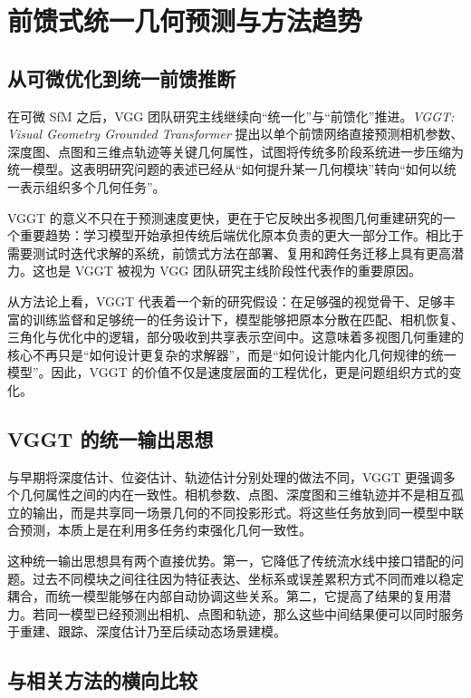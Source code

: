 \section{前馈式统一几何预测与方法趋势}

\subsection{从可微优化到统一前馈推断}

在可微 SfM 之后，VGG 团队研究主线继续向“统一化”与“前馈化”推进。\textit{VGGT: Visual Geometry Grounded Transformer} 提出以单个前馈网络直接预测相机参数、深度图、点图和三维点轨迹等关键几何属性，试图将传统多阶段系统进一步压缩为统一模型\cite{wang2025vggt}。这表明研究问题的表述已经从“如何提升某一几何模块”转向“如何以统一表示组织多个几何任务”。

VGGT 的意义不只在于预测速度更快，更在于它反映出多视图几何重建研究的一个重要趋势：学习模型开始承担传统后端优化原本负责的更大一部分工作。相比于需要测试时迭代求解的系统，前馈式方法在部署、复用和跨任务迁移上具有更高潜力\cite{wang2025vggt}。这也是 VGGT 被视为 VGG 团队研究主线阶段性代表作的重要原因。

从方法论上看，VGGT 代表着一个新的研究假设：在足够强的视觉骨干、足够丰富的训练监督和足够统一的任务设计下，模型能够把原本分散在匹配、相机恢复、三角化与优化中的逻辑，部分吸收到共享表示空间中。这意味着多视图几何重建的核心不再只是“如何设计更复杂的求解器”，而是“如何设计能内化几何规律的统一模型”。因此，VGGT 的价值不仅是速度层面的工程优化，更是问题组织方式的变化。

\subsection{VGGT 的统一输出思想}

与早期将深度估计、位姿估计、轨迹估计分别处理的做法不同，VGGT 更强调多个几何属性之间的内在一致性。相机参数、点图、深度图和三维轨迹并不是相互孤立的输出，而是共享同一场景几何的不同投影形式。将这些任务放到同一模型中联合预测，本质上是在利用多任务约束强化几何一致性\cite{wang2025vggt}。

这种统一输出思想具有两个直接优势。第一，它降低了传统流水线中接口错配的问题。过去不同模块之间往往因为特征表达、坐标系或误差累积方式不同而难以稳定耦合，而统一模型能够在内部自动协调这些关系。第二，它提高了结果的复用潜力。若同一模型已经预测出相机、点图和轨迹，那么这些中间结果便可以同时服务于重建、跟踪、深度估计乃至后续动态场景建模。

\subsection{与相关方法的横向比较}

